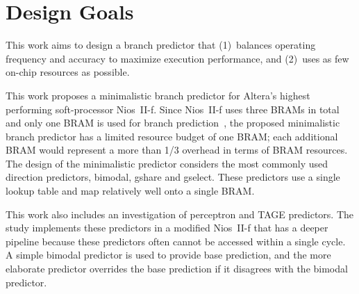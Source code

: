 \section{Design Goals}
\label{sec:goal}

This work aims to design a branch predictor that (1)~balances operating frequency and accuracy to maximize execution performance, and (2)~uses as few on-chip resources as possible.

This work proposes a minimalistic branch predictor for Altera's highest performing soft-processor Nios~II-f. Since Nios~II-f uses three BRAMs in total and only one BRAM is used for branch prediction~\cite{niosiif}, the proposed minimalistic branch predictor has a limited resource budget of one BRAM; each additional BRAM would represent a more than 1/3 overhead in terms of BRAM resources. The design of the minimalistic predictor considers the most commonly used direction predictors, bimodal, gshare and gselect. These predictors use a single lookup table and map relatively well onto a single BRAM.

This work also includes an investigation of perceptron and TAGE predictors. The study implements these predictors in a modified Nios~II-f that has a deeper pipeline because these predictors often cannot be accessed within a single cycle. A simple bimodal predictor is used to provide base prediction, and the more elaborate predictor overrides the base prediction if it disagrees with the bimodal predictor.


